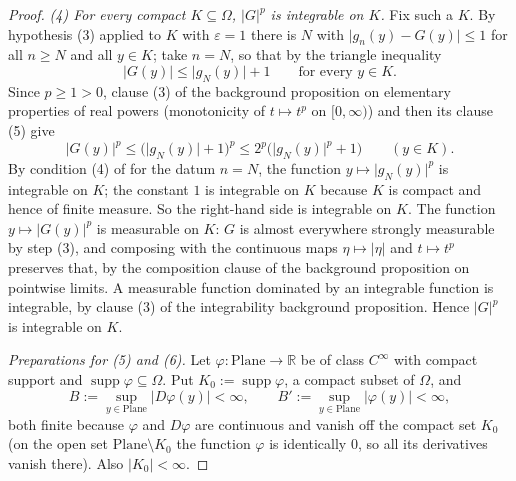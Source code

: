 \begin{proof}
\medskip\noindent\emph{(4) For every compact $K\subseteq\Omega$, $\lvert G\rvert^{p}$ is
integrable on $K$.}
Fix such a $K$.  By hypothesis (3) applied to $K$ with $\varepsilon=1$ there is $N$ with
$\lvert g_n(y)-G(y)\rvert\le1$ for all $n\ge N$ and all $y\in K$; take $n=N$, so that by the
triangle inequality
\[
  \lvert G(y)\rvert\le\lvert g_N(y)\rvert+1\qquad\text{for every }y\in K .
\]
Since $p\ge1>0$, clause (3) of the background proposition on elementary properties of real
powers (monotonicity of $t\mapsto t^{p}$ on $[0,\infty)$) and then its clause (5) give
\[
  \lvert G(y)\rvert^{p}\le\bigl(\lvert g_N(y)\rvert+1\bigr)^{p}
  \le2^{p}\bigl(\lvert g_N(y)\rvert^{p}+1\bigr)\qquad(y\in K).
\]
By condition (4) of  for the datum $n=N$, the function
$y\mapsto\lvert g_N(y)\rvert^{p}$ is integrable on $K$; the constant $1$ is integrable on $K$
because $K$ is compact and hence of finite measure.  So the right-hand side is integrable on
$K$.  The function $y\mapsto\lvert G(y)\rvert^{p}$ is measurable on $K$: $G$ is almost
everywhere strongly measurable by step (3), and composing with the continuous maps
$\eta\mapsto\lvert\eta\rvert$ and $t\mapsto t^{p}$ preserves that, by the composition clause of
the background proposition on pointwise limits.  A measurable function dominated by an
integrable function is integrable, by clause (3) of the integrability background proposition.
Hence $\lvert G\rvert^{p}$ is integrable on $K$.

\medskip\noindent\emph{Preparations for (5) and (6).}
Let $\varphi\colon\mathrm{Plane}\to\mathbb{R}$ be of class $C^\infty$ with compact support and
$\operatorname{supp}\varphi\subseteq\Omega$.  Put $K_0:=\operatorname{supp}\varphi$, a compact
subset of $\Omega$, and
\[
  B:=\sup_{y\in\mathrm{Plane}}\lvert D\varphi(y)\rvert<\infty,\qquad
  B':=\sup_{y\in\mathrm{Plane}}\lvert\varphi(y)\rvert<\infty,
\]
both finite because $\varphi$ and $D\varphi$ are continuous and vanish off the compact set
$K_0$ (on the open set $\mathrm{Plane}\setminus K_0$ the function $\varphi$ is identically $0$,
so all its derivatives vanish there).  Also $\lvert K_0\rvert<\infty$.


\end{proof}
